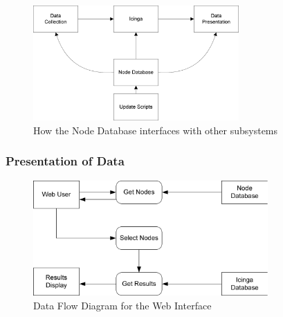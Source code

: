 \begin{figure}[htb]
\centering
\includegraphics[width=0.7\textwidth]{img/impl-structure.png}
\caption{How the Node Database interfaces with other subsystems}
\label{fig:node-struct}
\end{figure}

\subsubsection{Presentation of Data}

\begin{figure}[htb]
\centering
\includegraphics[width=0.8\textwidth]{img/web-dfd.png}
\caption{Data Flow Diagram for the Web Interface}
\label{fig:web}
\end{figure}

